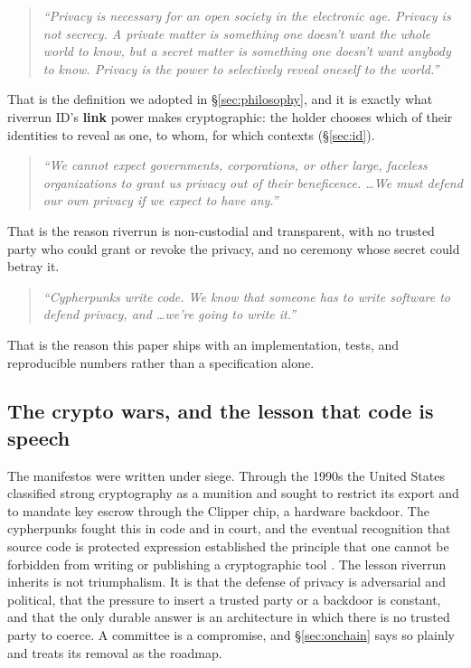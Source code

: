\documentclass[11pt]{article}
\begin{document}
\begin{quote}
\emph{``Privacy is necessary for an open society in the electronic age. Privacy is not
secrecy. A private matter is something one doesn't want the whole world to know, but a
secret matter is something one doesn't want anybody to know. Privacy is the power to
selectively reveal oneself to the world.''}
\end{quote}

That is the definition we adopted in \S\ref{sec:philosophy}, and it is exactly what
riverrun ID's \textbf{link} power makes cryptographic: the holder chooses which of their
identities to reveal as one, to whom, for which contexts (\S\ref{sec:id}).

\begin{quote}
\emph{``We cannot expect governments, corporations, or other large, faceless
organizations to grant us privacy out of their beneficence. \dots We must defend our own
privacy if we expect to have any.''}
\end{quote}

That is the reason riverrun is non-custodial and transparent, with no trusted party who
could grant or revoke the privacy, and no ceremony whose secret could betray it.

\begin{quote}
\emph{``Cypherpunks write code. We know that someone has to write software to defend
privacy, and \dots we're going to write it.''}
\end{quote}

That is the reason this paper ships with an implementation, tests, and reproducible
numbers rather than a specification alone.

\subsection{The crypto wars, and the lesson that code is speech}

The manifestos were written under siege. Through the 1990s the United States classified
strong cryptography as a munition and sought to restrict its export and to mandate key
escrow through the Clipper chip, a hardware backdoor. The cypherpunks fought this in
code and in court, and the eventual recognition that source code is protected expression
established the principle that one cannot be forbidden from writing or publishing a
cryptographic tool \cite{bernstein}. The lesson riverrun inherits is not triumphalism.
It is that the defense of privacy is adversarial and political, that the pressure to
insert a trusted party or a backdoor is constant, and that the only durable answer is an
architecture in which there is no trusted party to coerce. A committee is a compromise,
and \S\ref{sec:onchain} says so plainly and treats its removal as the roadmap.
\end{document}

